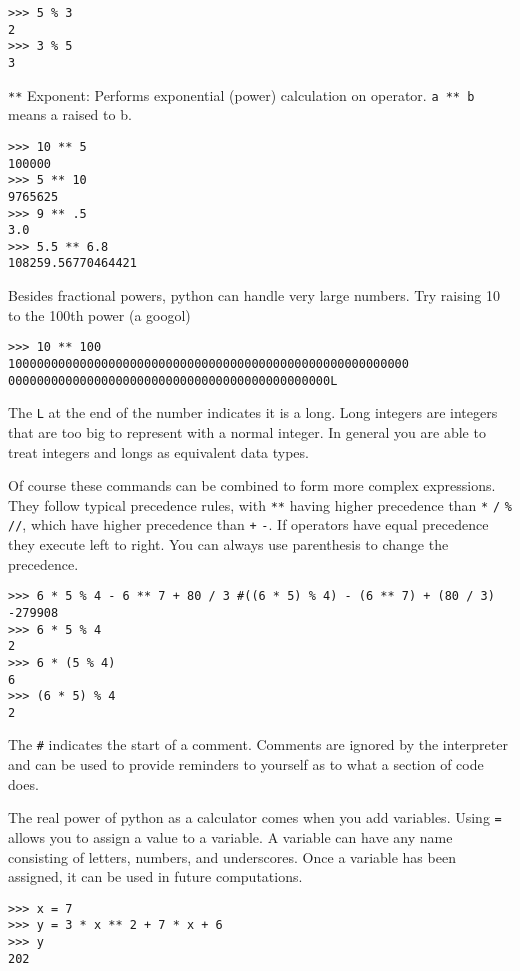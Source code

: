 \documentclass[12pt,hidelinks]{article}
\begin{document}
\begin{lstlisting}[style=bash]
>>> 5 % 3
2
>>> 3 % 5
3
\end{lstlisting}

\texttt{**} Exponent: Performs exponential (power) calculation on operator. \texttt{a ** b} means a raised to b.

\begin{lstlisting}[style=bash]
>>> 10 ** 5
100000
>>> 5 ** 10 
9765625
>>> 9 ** .5
3.0
>>> 5.5 ** 6.8
108259.56770464421
\end{lstlisting}

Besides fractional powers, python can handle very large numbers. Try raising 10 to the 100th power (a googol)

\begin{lstlisting}[style=bash]
>>> 10 ** 100
10000000000000000000000000000000000000000000000000000000
000000000000000000000000000000000000000000000L
\end{lstlisting}

The \texttt{L} at the end of the number indicates it is a long. Long integers are integers that are too big to represent with a normal integer. In general you are able to treat integers and longs as equivalent data types.

Of course these commands can be combined to form more complex expressions. They follow typical precedence rules, with \texttt{**} having higher precedence than \texttt{*} \texttt{/} \texttt{\%} \texttt{//}, which have higher precedence than \texttt{+} \texttt{-}. If operators have equal precedence they execute left to right. You can always use parenthesis to change the precedence.

\begin{lstlisting}[style=bash]
>>> 6 * 5 % 4 - 6 ** 7 + 80 / 3 #((6 * 5) % 4) - (6 ** 7) + (80 / 3)
-279908
>>> 6 * 5 % 4
2
>>> 6 * (5 % 4)
6
>>> (6 * 5) % 4
2
\end{lstlisting}

The \texttt{\#} indicates the start of a comment. Comments are ignored by the interpreter and can be used to provide reminders to yourself as to what a section of code does.

The real power of python as a calculator comes when you add variables. Using \texttt{=} allows you to assign a value to a variable. A variable can have any name consisting of letters, numbers, and underscores. Once a variable has been assigned, it can be used in future computations.

\begin{lstlisting}[style=bash]
>>> x = 7
>>> y = 3 * x ** 2 + 7 * x + 6
>>> y
202
\end{lstlisting}
\end{document}
